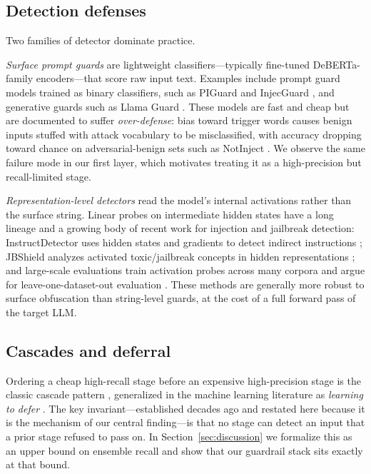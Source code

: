 \documentclass[conference]{IEEEtran}
\begin{document}
\subsection{Detection defenses}
\label{sec:defenses}
Two families of detector dominate practice.

\emph{Surface prompt guards} are lightweight classifiers---typically fine-tuned
DeBERTa-family encoders---that score raw input text. Examples include
prompt guard models trained as binary classifiers, such as PIGuard
\cite{li2025} and InjecGuard \cite{injecguard}, and generative guards such as
Llama Guard \cite{inan2023}. These
models are fast and cheap but are documented to suffer \emph{over-defense}:
bias toward trigger words causes benign inputs stuffed with attack vocabulary to
be misclassified, with accuracy dropping toward chance on adversarial-benign
sets such as NotInject \cite{li2025,injecguard}. We observe the same failure mode in our
first layer, which motivates treating it as a high-precision but
recall-limited stage.

\emph{Representation-level detectors} read the model's internal activations
rather than the surface string. Linear probes on intermediate hidden states have
a long lineage \cite{alain2016} and a growing body of recent work for
injection and jailbreak detection: InstructDetector uses hidden states and
gradients to detect indirect instructions \cite{instructdetector}; JBShield
analyzes activated toxic/jailbreak concepts in hidden representations
\cite{jbshield}; and large-scale evaluations train activation probes across
many corpora and argue for leave-one-dataset-out evaluation
\cite{fomin2026,auc2026}. These methods are generally more robust to surface
obfuscation than string-level guards, at the cost of a full forward pass of the
target LLM.

\subsection{Cascades and deferral}
\label{sec:cascade}
Ordering a cheap high-recall stage before an expensive high-precision stage is
the classic cascade pattern \cite{viola2001}, generalized in the machine
learning literature as \emph{learning to defer} \cite{madras2018}. The key
invariant---established decades ago and restated here because it is the
mechanism of our central finding---is that no stage can detect an input that a
prior stage refused to pass on. In Section~\ref{sec:discussion} we formalize
this as an upper bound on ensemble recall and show that our guardrail stack
sits exactly at that bound.
\end{document}
